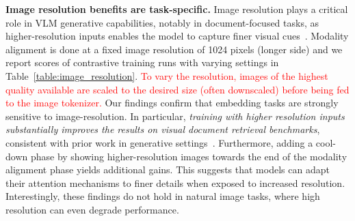 \noindent\textbf{Image resolution benefits are task-specific.} 
Image resolution plays a critical role in VLM generative capabilities, notably in document-focused tasks, as higher-resolution inputs enables the model to capture finer visual cues~\citep{hu2024mplugdocowl2highresolutioncompressingocrfree,marafioti2025smolvlmredefiningsmallefficient}.
Modality alignment is done at a fixed image resolution of 1024 pixels (longer side) and we report scores of contrastive training runs with varying settings in Table~\ref{table:image_resolution}. \textcolor{red}{To vary the resolution, images of the highest quality available are scaled to the desired size (often downscaled) before being fed to the image tokenizer.} Our findings confirm that embedding tasks are strongly sensitive to image-resolution. In particular, \textit{training with higher resolution inputs substantially improves the results on visual document retrieval benchmarks}, consistent with prior work in generative settings~\cite{beyer2024paligemmaversatile3bvlm,mckinzie2024mm1methodsanalysis}. Furthermore, adding a cool-down phase by showing higher-resolution images towards the end of the modality alignment phase yields additional gains. This suggests that models can adapt their attention mechanisms to finer details when exposed to increased resolution. Interestingly, these findings do not hold in natural image tasks, where high resolution can even degrade performance.



    
